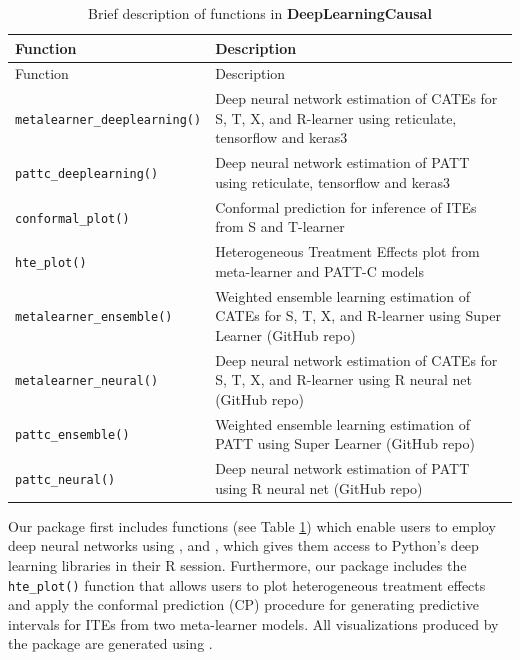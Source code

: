 \protect{}\label{tab:function-list-tab}
\begin{longtable}[]{@{}
  >{\raggedright\arraybackslash}p{}
  >{\raggedright\arraybackslash}p{}@{}}
\caption{\label{tab:function-list} Brief description of functions in \textbf{DeepLearningCausal}}\tabularnewline
\toprule\noalign{}
\begin{minipage}[b]{\linewidth}\raggedright
Function
\end{minipage} & \begin{minipage}[b]{\linewidth}\raggedright
Description
\end{minipage} \\
\midrule\noalign{}
\endfirsthead
\toprule\noalign{}
\begin{minipage}[b]{\linewidth}\raggedright
Function
\end{minipage} & \begin{minipage}[b]{\linewidth}\raggedright
Description
\end{minipage} \\
\midrule\noalign{}
\endhead
\bottomrule\noalign{}
\endlastfoot
\texttt{metalearner\_deeplearning()} & Deep neural network estimation of CATEs for S, T, X, and R-learner using reticulate, tensorflow and keras3 \\
\texttt{pattc\_deeplearning()} & Deep neural network estimation of PATT using reticulate, tensorflow and keras3 \\
\texttt{conformal\_plot()} & Conformal prediction for inference of ITEs from S and T-learner \\
\texttt{hte\_plot()} & Heterogeneous Treatment Effects plot from meta-learner and PATT-C models \\
\texttt{metalearner\_ensemble()} & Weighted ensemble learning estimation of CATEs for S, T, X, and R-learner using Super Learner (GitHub repo) \\
\texttt{metalearner\_neural()} & Deep neural network estimation of CATEs for S, T, X, and R-learner using R neural net (GitHub repo) \\
\texttt{pattc\_ensemble()} & Weighted ensemble learning estimation of PATT using Super Learner (GitHub repo) \\
\texttt{pattc\_neural()} & Deep neural network estimation of PATT using R neural net (GitHub repo) \\
\end{longtable}

Our package first includes functions (see Table \ref{tab:function-list}) which enable users to employ deep
neural networks using ,  and
, which gives them access to Python's deep learning
libraries in their R session. Furthermore, our package includes the
\texttt{hte\_plot()} function that allows users to plot heterogeneous treatment
effects and apply the conformal prediction (CP) procedure for generating
predictive intervals for ITEs from two meta-learner models. All
visualizations produced by the package are generated using 
\citep{ggplot2}.

